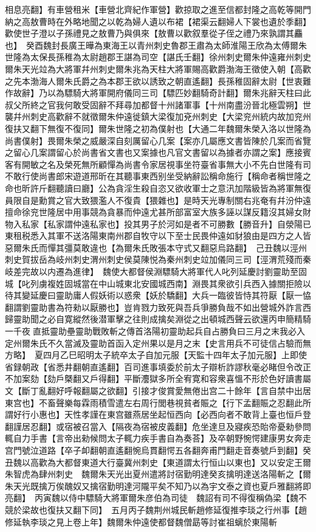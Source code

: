 相息亮翻】有車營租米【車營北齊紀作軍營】歡掠取之進至信都封隆之高乾等開門納之高敖曹時在外略地聞之以乾為婦人遺以布裙【裙渠云翻婦人下裳也遺於季翻】歡使世子澄以子孫禮見之敖曹乃與俱來【敖曹以歡叙羣從子侄之禮乃來孰謂其麤也】　癸酉魏封長廣王曄為東海王以青州刺史魯郡王肅為太師淮陽王欣為太傅爾朱世隆為太保長孫稚為太尉趙郡王諶為司空【諶氏壬翻】徐州刺史爾朱仲遠雍州刺史爾朱天光竝為大將軍幷州刺史爾朱兆為天柱大將軍賜高歡爵渤海王徵使入朝【高歡之先本渤海人爾朱氏爵之為本郡王欲以誘致之朝直遙翻】長孫稚固辭太尉【世衷難作故辭】乃以為驃騎大將軍開府儀同三司【驃匹妙翻騎奇計翻】爾朱兆辭天柱曰此叔父所終之官我何敢受固辭不拜尋加都督十州諸軍事【十州南盡汾晉北極雲朔】世襲幷州刺史高歡辭不就徵爾朱仲遠徙鎮大梁復加兗州刺史【大梁兖州統内故加兖州復扶又翻下無復不復同】爾朱世隆之初為僕射也【大通二年魏爾朱榮入洛以世隆為尚書僕射】畏爾朱榮之威嚴深自刻厲留心几案【案亦几屬應文書皆陳於几案而省覽之留心几案謂留心於尚書省文書也又案據也凡官文書留以為據者亦謂之案】應接賓客有開敏之名及榮死無所顧憚為尚書令家居視事坐符臺省事無大小不先白世隆有司不敢行使尚書郎宋遊道邢昕在其聽事東西别坐受納辭訟稱命施行【稱命者稱世隆之命也昕許斤翻聽讀曰廳】公為貪淫生殺自恣又欲收軍士之意汛加階級皆為將軍無復員限自是勳賞之官大致猥濫人不復貴【猥雜也】是時天光專制關右兆奄有幷汾仲遠擅命徐兖世隆居中用事競為貪暴而仲遠尤甚所部富室大族多誣以謀反籍沒其婦女財物入私家【私家謂仲遠私家也】投其男子於河如是者不可勝數【勝音升】自滎陽已東租税悉入其軍不送洛陽東南州郡自牧守以下至士民畏仲遠如豺狼由是四方之人皆惡爾朱氏而憚其彊莫敢違也【為爾朱氏敗張本守式又翻惡烏路翻】　己丑魏以涇州刺史賀拔岳為岐州刺史渭州刺史侯莫陳悦為秦州刺史竝加儀同三司【涇渭荒殘而秦岐差完故以内遷為進律】　魏使大都督侯淵驃騎大將軍代人叱列延慶討劉靈助至固城【叱列虜複姓固城當在中山城東北安國城西南】淵畏其衆欲引兵西入據關拒險以待其變延慶曰靈助庸人假妖術以惑衆【妖於驕翻】大兵一臨彼皆恃其符厭【厭一恊翻謂劉靈助書為符勑以厭勝也】豈肯戮力致死與吾兵爭勝負哉不如出營城外詐言西歸靈助聞之必自寛縱然後潜軍擊之往則成擒矣淵從之出頓城西聲云欲還丙申簡精騎一千夜直抵靈助壘靈助戰敗斬之傳首洛陽初靈助起兵自占勝負曰三月之末我必入定州爾朱氏不久當滅及靈助首函入定州果以是月之末【史言用兵不可徒信占驗而無方略】　夏四月乙巳昭明太子統卒太子自加元服【天監十四年太子加元服】上即使省録朝政【省悉井翻朝直遙翻】百司進事填委於前太子辯析詐謬秋毫必睹但令改正不加案劾【劾戶槩翻又戶得翻】平斷灋獄多所全宥寛和容衆喜慍不形於色好讀書屬文【斷丁亂翻好呼報翻屬之欲翻】引接才俊賞愛無倦出宫二十餘年【言自禁中出居東宫也】不畜聲樂每霖雨積雪遣左右周行閭巷視貧者賑之【行下孟翻賑之忍翻此所謂好行小惠也】天性孝謹在東宫雖燕居坐起恒西向【必西向者不敢背上臺也恒戶登翻謹居忍翻】或宿被召當入【隔夜為宿被皮義翻】危坐達旦及寢疾恐貽帝憂勑參問輒自力手書【言帝出勑候問太子輒力疾手書自為奏荅】及卒朝野惋愕建康男女奔走宫門號泣道路【卒子卹翻朝直遙翻惋烏貫翻愕五各翻奔甫門翻走音奏號戶到翻】癸丑魏以高歡為大都督東道大行臺冀州刺史【東道謂太行恒山以東也】又以安定王爾朱智虎為肆州刺史　魏爾朱天光出夏州遣將討宿勤明達癸亥擒明達送洛陽斬之【爾朱天光既擒万俟醜奴又擒宿勤明達河隴平矣不知乃以為宇文泰之資也夏戶雅翻將即亮翻】　丙寅魏以侍中驃騎大將軍爾朱彦伯為司徒　魏詔有司不得復稱偽梁【魏不競於梁故也復扶又翻下同】　五月丙子魏荆州城民斬趙修延復推李琰之行州事【趙修延執李琰之見上卷上年】魏爾朱仲遠使都督魏僧勗等討崔祖螭於東陽斬


